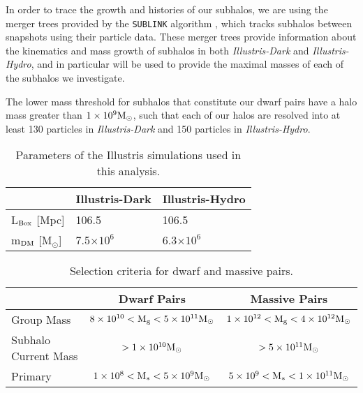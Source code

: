\documentclass[twocolumn]{aastex63}
\newcommand\msun{\rm{M}_{\odot}}
\newcommand{\kc}[1]{\textcolor{mypink}{\textbf{#1}} }
\begin{document}
In order to trace the growth and histories of our subhalos, we are using the merger trees provided by the \texttt{SUBLINK} algorithm \citep{gomez15}, which tracks subhalos between snapshots using their particle data. These merger trees provide information about the kinematics and mass growth of subhalos in both \textit{Illustris-Dark} and \textit{Illustris-Hydro}, and in particular will be used to provide the maximal masses of each of the subhalos we investigate.

The lower mass threshold for subhalos that constitute our dwarf pairs have a halo mass greater than $1\times10^9\msun$, such that each of our halos are resolved into at least 130 particles in \textit{Illustris-Dark} and 150 particles in \textit{Illustris-Hydro}. 


\begin{table}[htb]
\begin{tabular}{lll}
 & Illustris-Dark & Illustris-Hydro \\\hline\hline
 L$_{\rm Box}$ [Mpc] & 106.5 & 106.5 \\
m$_{\rm DM}$ [M$_\odot$] & 7.5$\times10^6$ & 6.3$\times10^6$ \\\hline
\end{tabular}
\caption{\label{table:illustris}Parameters of the Illustris simulations used in this analysis.}
\end{table}

\begin{table*}[htb]
  \begin{center}
    \begin{tabular}{lcc}
     & Dwarf Pairs & Massive Pairs \\\hline\hline
    Group Mass & $8\times10^{10} < \rm M_g < 5\times10^{11} M_\odot$ & $1\times10^{12} < \rm M_g < 4\times10^{12} M_\odot$  \\
    Subhalo Current Mass & $>1\times10^{10} \msun$ & $> 5\times10^{11} \msun$ \\
    Primary &$1\times10^{8} < \rm M_* < 5\times10^{9} \msun$ & $5\times10^{9} < \rm M_* < 1\times10^{11} \msun$\\\hline
    \end{tabular}
    \caption{\label{table:mass}Selection criteria for dwarf and massive pairs.}
  \end{center}
    \end{table*}
\end{document}
